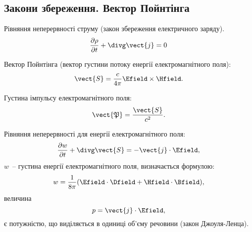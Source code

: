 \subsection*{Закони збереження. Вектор Пойнтінга}

\begin{Theory}
Рівняння неперервності струму (закон збереження електричного заряду).
	\begin{equation} \label{charge_conservation_law}
		\frac{\partial \rho}{\partial t} + \divg\vect{j} = 0
	\end{equation}

Вектор Пойнтінга (вектор густини потоку енергії електромагнітного поля):
	\begin{equation}
			\vect{S} = \frac{c}{4\pi} \Efield\times\Hfield.
	\end{equation}

Густина імпульсу електромагнітного поля:
\begin{equation}
	\vect{\mathfrak{P}} = \frac{\vect{S}}{c^2}.
\end{equation}

Рівняння неперервності для енергії електромагнітного поля:
	\begin{equation}
		\frac{\partial w}{\partial t} + \divg\vect{S} = -  \vect{j}\cdot\Efield,
	\end{equation}
$ w $~-- густина енергії електромагнітного поля, визначається формулою:
	\begin{equation}
		w = \frac{1}{8\pi} (\Efield\cdot\Dfield + \Hfield\cdot\Bfield),
	\end{equation}
величина
	\begin{equation}
		p =\vect{j}\cdot\Efield ,
	\end{equation}
є потужністю, що виділяється в одиниці об'єму речовини (закон Джоуля-Ленца).
\end{Theory}




